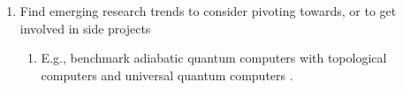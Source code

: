 \begin{enumerate}
\begin{enumerate}
		\begin{enumerate} \itemsep -2pt
		\item Run as: {\bf ./not\_defined\_references.py  [LaTeX sources] [BibTeX input]}
		\item Check if this citation uses a undefined reference
		\item No output required.
		\end{enumerate}
	\item {\tt uncomment\_latex\_src\_files.py}: \vspace{-0.2cm}
		\begin{enumerate} \itemsep -2pt
		\item Run as: {\bf ./uncomment\_latex\_src\_files.py [dirty LaTeX source files] [clean LaTeX source files]}
		\item Remove comments from \LaTeX\ source files. Non importante.
		\end{enumerate}
	\end{enumerate}
\item Find emerging research trends to consider pivoting towards, or to get involved in side projects \vspace{-0.3cm}
	\begin{enumerate} \itemsep -2pt
	\item E.g., benchmark adiabatic quantum computers with topological computers and universal quantum computers \cite{Tandon2017}.
	\end{enumerate}
\end{enumerate}

























